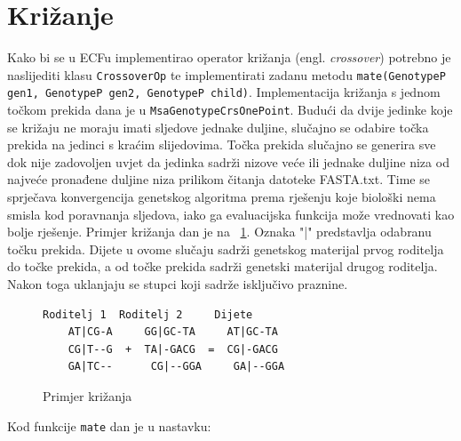\documentclass[times, utf8, zavrsni, numeric]{fer}
\begin{document}
 \section{Križanje}
 Kako bi se u ECFu implementirao operator križanja (engl. \textit{crossover}) potrebno je naslijediti klasu \texttt{CrossoverOp} te implementirati zadanu metodu \texttt{mate(GenotypeP gen1, GenotypeP gen2, GenotypeP child)}. Implementacija križanja s jednom točkom prekida dana je u \texttt{MsaGenotypeCrsOnePoint}. Budući da dvije jedinke koje se križaju ne moraju imati sljedove jednake duljine, slučajno se odabire točka prekida na jedinci s kraćim slijedovima. Točka prekida slučajno se generira sve dok nije zadovoljen uvjet da jedinka sadrži nizove veće ili jednake duljine niza od najveće pronađene duljine niza prilikom čitanja datoteke FASTA.txt. Time se sprječava konvergencija genetskog algoritma prema rješenju koje biološki nema smisla kod poravnanja sljedova, iako ga evaluacijska funkcija može vrednovati kao bolje rješenje. Primjer križanja dan je na ~\ref{fig:krizanje}. Oznaka "|" predstavlja odabranu točku prekida. Dijete u ovome slučaju sadrži genetskog materijal prvog roditelja do točke prekida, a od točke prekida sadrži genetski materijal drugog roditelja. Nakon toga uklanjaju se stupci koji sadrže isključivo praznine.
 \begin{figure}
 \begin{verbatim}
Roditelj 1  Roditelj 2     Dijete
 	AT|CG-A     GG|GC-TA     AT|GC-TA
 	CG|T--G	 +  TA|-GACG  =  CG|-GACG
 	GA|TC--	     CG|--GGA     GA|--GGA
 \end{verbatim}
 \caption{Primjer križanja}
 \label{fig:krizanje}
\end{figure}
 
 Kod funkcije \texttt{mate} dan je u nastavku:
 
\end{document}
